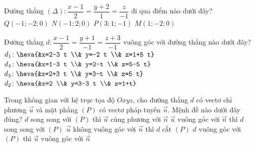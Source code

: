 \begin{ex}%
	Đường thẳng $(\Delta)\colon \dfrac{x-1}{2}=\dfrac{y+2}{1}=\dfrac{z}{-1}$ đi qua điểm nào dưới đây?
	\choice
	{$Q(-1 ;-2 ; 0)$}
	{$N(-1 ; 2 ; 0)$}
	{$P(3 ; 1 ;-1)$}
	{\True $M(1 ;-2 ; 0)$}
\end{ex}

\begin{ex}%
	Đường thẳng $d\colon \dfrac{x-1}{2}=\dfrac{y+1}{-1}=\dfrac{z+3}{-1}$ vuông góc với đường thẳng nào dưới đây?
	\choice
	{$d_1\colon \heva{&x=2-3 t \\& y=-2 t \\& z=1+5 t}$}
	{\True $d_4\colon \heva{&x=1-3 t \\& y=2-t \\& z=5-5 t}$}
	{$d_3\colon \heva{&x=2+3 t \\& y=3-t \\& z=5 t}$}
	{$d_2\colon \heva{&x=2 \\& y=3-3 t \\& z=1+t}$}
\end{ex}

\begin{ex}%
	Trong không gian với hệ trục tọa độ $Oxyz$, cho đường thẳng $d$ có vectơ chỉ phương $\overrightarrow{u}$ và mặt phẳng $(P)$ có vectơ pháp tuyến $\overrightarrow{n}$. Mệnh đề nào dưới đây đúng?
	\choice
	{$d$ song song với $(P)$ thì $\overrightarrow{u}$ cùng phương với $\overrightarrow{n}$}
	{$\overrightarrow{u}$ vuông góc với $\overrightarrow{n}$ thì $d$ song song với $(P)$}
	{\True $\overrightarrow{u}$ không vuông góc với $\overrightarrow{n}$ thì $d$ cắt $(P)$}
	{$d$ vuông góc với $(P)$ thì $\overrightarrow{u}$ vuông góc với $\overrightarrow{n}$}
\end{ex}

